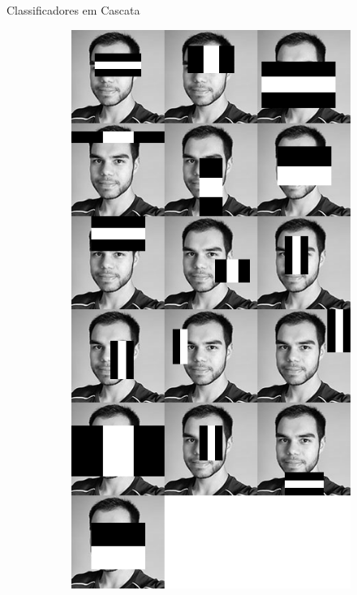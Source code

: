 \begin{frame}{Classificadores em Cascata}
\begin{figure}[htbp]
\begin{subfigure}[t]{0.24\textwidth}
    \includegraphics[height=0.6\textheight,width=\textwidth,keepaspectratio]{imagens/cascata_estagio_02.png}
    \end{subfigure}
    \begin{subfigure}[t]{0.24\textwidth}

\end{subfigure}
\end{figure}
\end{frame}
